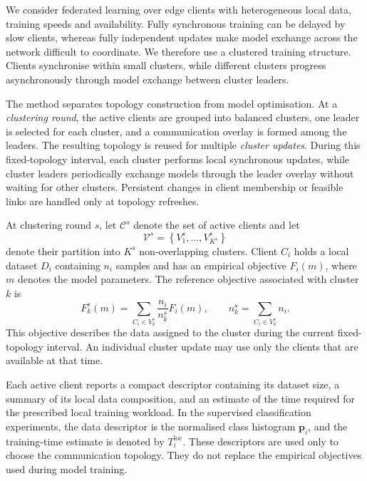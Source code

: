 \documentclass[pdflatex,sn-mathphys-num]{sn-jnl}
\begin{document}
We consider federated learning over edge clients with heterogeneous local data, training speeds and availability. Fully synchronous training can be delayed by slow clients, whereas fully independent updates make model exchange across the network difficult to coordinate. We therefore use a clustered training structure. Clients synchronise within small clusters, while different clusters progress asynchronously through model exchange between cluster leaders.

The method separates topology construction from model optimisation. At a \emph{clustering round}, the active clients are grouped into balanced clusters, one leader is selected for each cluster, and a communication overlay is formed among the leaders. The resulting topology is reused for multiple \emph{cluster updates}. During this fixed-topology interval, each cluster performs local synchronous updates, while cluster leaders periodically exchange models through the leader overlay without waiting for other clusters. Persistent changes in client membership or feasible links are handled only at topology refreshes.

At clustering round \(s\), let \(\mathcal{C}^{s}\) denote the set of active clients and let
\[
\mathcal{V}^{s}
=
\left\{
V_1^s,\ldots,V_{K^s}^s
\right\}
\]
denote their partition into \(K^s\) non-overlapping clusters. Client \(C_i\) holds a local dataset \(D_i\) containing \(n_i\) samples and has an empirical objective \(F_i(m)\), where \(m\) denotes the model parameters. The reference objective associated with cluster \(k\) is
\begin{equation}
F_k^s(m)
=
\sum_{C_i\in V_k^s}
\frac{n_i}{n_k^s}
F_i(m),
\qquad
n_k^s
=
\sum_{C_i\in V_k^s}n_i .
\label{eq:cluster_objective}
\end{equation}
This objective describes the data assigned to the cluster during the current fixed-topology interval. An individual cluster update may use only the clients that are available at that time.

Each active client reports a compact descriptor containing its dataset size, a summary of its local data composition, and an estimate of the time required for the prescribed local training workload. In the supervised classification experiments, the data descriptor is the normalised class histogram \(\mathbf{p}_i\), and the training-time estimate is denoted by \(T_i^{\mathrm{loc}}\). These descriptors are used only to choose the communication topology. They do not replace the empirical objectives used during model training.
\end{document}
